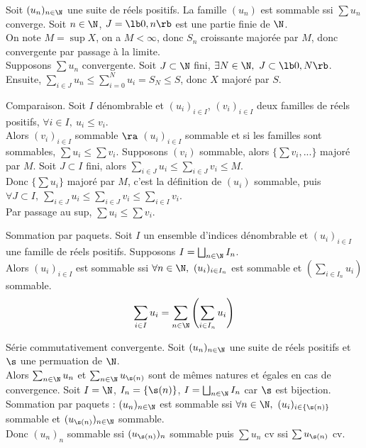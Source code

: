 \documentclass[11pt]{article}
\begin{document}
\begin{prop}{}{}
    Soit $(u_n)_{n\in\N}$ une suite de réels positifs. La famille $(u_n)$ est sommable ssi $\sum u_n$ converge.
    \tcblower
    \boxed{\ra} Soit $n\in\N$, $J=\lb0,n\rb$ est une partie finie de $\N$.\\
    On note $M=\sup X$, on a $M<\infty$, donc $S_n$ croissante majorée par $M$, donc convergente par passage à la limite.\\
    \boxed{\la} Supposons $\sum u_n$ convergente. Soit $J\subset \N$ fini, $\exists N \in \N, ~ J \subset \lb0,N\rb$.\\
    Ensuite, $\sum_{i\in J} u_n \leq \sum_{i=0}^Nu_i = S_N \leq S$, donc $X$ majoré par $S$.
\end{prop}

\begin{thm}{Comparaison.}{}
    Soit $I$ dénombrable et $(u_i)_{i\in I}$, $(v_i)_{i\in I}$ deux familles de réels positifs, $\forall i \in I, ~ u_i \leq v_i$.\\
    Alors $(v_i)_{i\in I}$ sommable $\ra$ $(u_i)_{i\in I}$ sommable et si les familles sont sommables, $\sum u_i \leq \sum v_i$.
    \tcblower
    Supposons $(v_i)$ sommable, alors $\{\sum v_i, ...\}$ majoré par $M$. Soit $J\subset I$ fini, alors $\sum_{i\in J}u_i \leq \sum_{i\in J}v_i \leq M$.\\
    Donc $\{\sum u_i\}$ majoré par $M$, c'est la définition de $(u_i)$ sommable, puis $\forall J \subset I, ~ \sum_{i\in J} u_i \leq \sum_{i\in J} v_i \leq \sum_{i\in I}v_i$.\\
    Par passage au sup, $\sum u_i \leq \sum v_i$.
\end{thm}

\begin{thm}{Sommation par paquets.}{}
    Soit $I$ un ensemble d'indices dénombrable et $(u_i)_{i\in I}$ une famille de réels positifs. Supposons $I=\bigsqcup_{n\in \N}I_n$.\\
    Alors $(u_i)_{i\in I}$ est sommable ssi $\forall n \in \N, ~ (u_i)_{i\in I_n}$ est sommable  et $\left(\sum_{i\in I_n}u_i\right)$ sommable.
    \begin{equation*}
        \sum_{i\in I}u_i = \sum_{n\in\N}\left( \sum_{i\in I_n} u_i \right)
    \end{equation*}
\end{thm}

\begin{prop}{Série commutativement convergente.}{}
    Soit $(u_n)_{n\in\N}$ une suite de réels positifs et $\s$ une permuation de $\N$.\\
    Alors $\sum_{n\in\N}u_n$ et $\sum_{n\in\N}u_{\s(n)}$ sont de mêmes natures et égales en cas de convergence.
    \tcblower
    Soit $I=\N$, $I_n=\{\s(n)\}$, $I=\bigsqcup_{n\in\N}I_n$ car $\s$ est bijection.\\
    Sommation par paquets : $(u_n)_{n\in\N}$ est sommable ssi $\forall n \in \N, ~ (u_i)_{i\in\{\s(n)\}}$ sommable et $(u_{\s(n)})_{n\in\N}$ sommable.\\
    Donc $(u_n)_n$ sommable ssi $(u_{\s(n)})_n$ sommable puis $\sum u_n$ cv ssi $\sum u_{\s(n)}$ cv. 
\end{prop}
\end{document}
